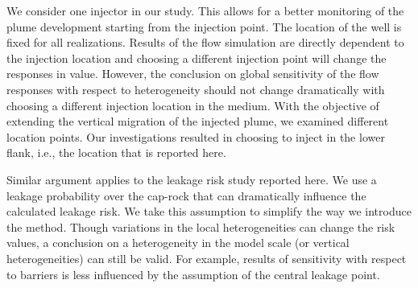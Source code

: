 {We consider one injector in our study. This allows for a better monitoring of the plume development starting from the injection point. The location of the well is fixed for all realizations. Results of the flow simulation are directly dependent to the injection location and choosing a different injection point will change the responses in value. However, the conclusion on global sensitivity of the flow responses with respect to heterogeneity should not change dramatically with choosing a different injection location in the medium. With the objective of extending the vertical migration of the injected plume, we examined different location points. Our investigations resulted in choosing to inject in the lower flank, i.e., the location that is reported here. 

Similar argument applies to the leakage risk study reported here. We use a leakage probability over the cap-rock that can dramatically influence the calculated leakage risk. We take this assumption to simplify the way we introduce the method. Though variations in the local heterogeneities can change the risk values, a conclusion on a heterogeneity in the model scale (or vertical heterogeneities) can still be valid. For example, results of sensitivity with respect to barriers is less influenced by the assumption of the central leakage point.  
 
}%


